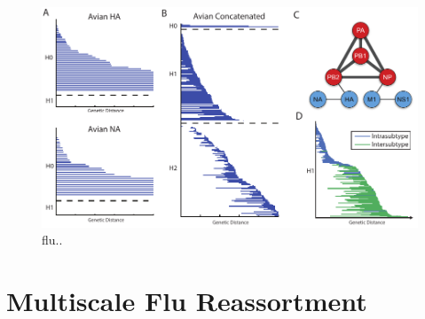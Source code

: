 \begin{figure}
\begin{center}
\centerline{\includegraphics[width=\columnwidth]{./fig/influenza_Fig3.pdf}}
\caption[flu...]{flu..}
\label{fig:flu_scatterplot}
\end{center}
\end{figure}

\section{Multiscale Flu Reassortment}
\label{sec:flu_multiscale_reassortment}

